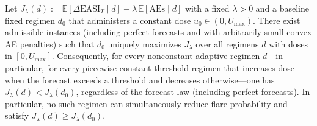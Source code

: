 ﻿\begin{theorem}\label{thm:constant-unique-max}
Let \(J_\lambda(d):=\mathbb{E}[\Delta\mathrm{EASI}_T\mid d]-\lambda\,\mathbb{E}[\mathrm{AEs}\mid d]\) with a fixed \(\lambda>0\) and a baseline fixed regimen \(d_0\) that administers a constant dose \(u_0\in(0,U_{\max})\). There exist admissible instances (including perfect forecasts and with arbitrarily small convex AE penalties) such that \(d_0\) uniquely maximizes \(J_\lambda\) over all regimens \(d\) with doses in \([0,U_{\max}]\). Consequently, for every nonconstant adaptive regimen \(d\)---in particular, for every piecewise-constant threshold regimen that increases dose when the forecast exceeds a threshold and decreases otherwise---one has \(J_\lambda(d)<J_\lambda(d_0)\), regardless of the forecast law (including perfect forecasts). In particular, no such regimen can simultaneously reduce flare probability and satisfy \(J_\lambda(d)\ge J_\lambda(d_0)\).
\end{theorem}

